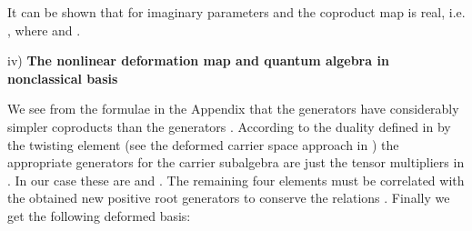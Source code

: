 \documentclass[a4paper,12pt,showkeys]{article}
\begin{document}
It can be shown that for imaginary parameters \myHighlight{$\alpha$}\coordHE{} and \myHighlight{$\xi$}\coordHE{}
the coproduct map is real, i.e. \coordHE{}, where
\coordHE{} and \coordHE{}.

iv) {\bf The nonlinear deformation map and quantum \coordHE{} algebra in
nonclassical basis}

We see from the formulae in the Appendix that the generators
\coordHE{} have considerably simpler coproducts
than the generators \coordHE{}.
 According to the duality defined in
 \coordHE{} by the twisting element \coordHE{} (see the deformed
 carrier space approach in
  \cite{ll16}) the appropriate generators for the
 carrier subalgebra are just the tensor multipliers in
 \coordHE{}. In our case these are \coordHE{} and \coordHE{}. The remaining four elements must be
 correlated with the obtained new positive root generators \coordHE{} to conserve the relations \coordHE{}.
 Finally we get the following deformed basis:
\end{document}
